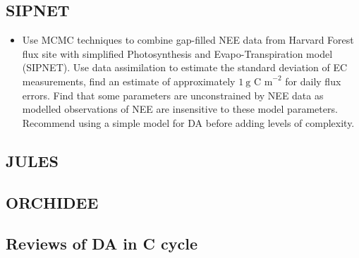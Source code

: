 \documentclass[12pt, a4paper]{article}
\begin{document}
\subsection{SIPNET}

\begin{itemize}

\item \citet{braswell2005estimating} Use MCMC techniques to combine gap-filled NEE data from Harvard Forest flux site with simplified Photosynthesis and Evapo-Transpiration model (SIPNET). Use data assimilation to estimate the standard deviation of EC measurements, find an estimate of approximately \(1~\text{g C m}^{-2}\) for daily flux errors. Find that some parameters are unconstrained by NEE data as modelled observations of NEE are insensitive to these model parameters. Recommend using a simple model for DA before adding levels of complexity.  

\end{itemize}
 
\subsection{JULES}

\subsection{ORCHIDEE}

\subsection{Reviews of DA in C cycle}
\end{document}
